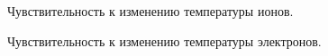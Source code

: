 \documentclass[14pt, a4paper, fleqn, twoside]{extreport}
\begin{document}
\medskip

\begin{figure}
\caption{Чувствительность к изменению температуры ионов.}
\end{figure}

\begin{figure}
\caption{Чувствительность к изменению температуры электронов.}
\end{figure}
\end{document}
